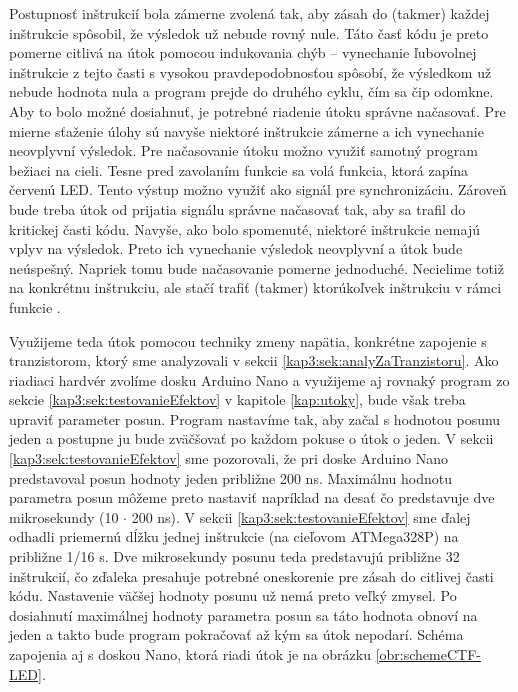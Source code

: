 Postupnosť inštrukcií bola zámerne zvolená tak, aby zásah do (takmer) každej inštrukcie spôsobil, že výsledok už nebude rovný nule. Táto časť kódu je preto pomerne citlivá na útok pomocou indukovania chýb -- vynechanie ľubovolnej inštrukcie z tejto časti s vysokou pravdepodobnosťou spôsobí, že výsledkom už nebude hodnota nula a program prejde do druhého cyklu, čím sa čip odomkne. Aby to bolo možné dosiahnuť, je potrebné riadenie útoku správne načasovať. Pre mierne sťaženie úlohy sú navyše niektoré inštrukcie zámerne  a ich vynechanie neovplyvní výsledok. Pre načasovanie útoku možno využiť samotný program bežiaci na cieli. Tesne pred zavolaním funkcie  sa volá funkcia, ktorá zapína červenú LED. Tento výstup možno využiť ako signál pre synchronizáciu. Zároveň bude treba útok od prijatia signálu správne načasovať tak, aby sa trafil do kritickej časti kódu. Navyše, ako bolo spomenuté, niektoré inštrukcie nemajú vplyv na výsledok. Preto ich vynechanie výsledok neovplyvní a útok bude neúspešný. Napriek tomu bude načasovanie pomerne jednoduché. Necielime totiž na konkrétnu inštrukciu, ale stačí trafiť (takmer) ktorúkoľvek inštrukciu v rámci funkcie .

Využijeme teda útok pomocou techniky zmeny napätia, konkrétne zapojenie s tranzistorom, ktorý sme analyzovali v sekcii \ref{kap3:sek:analyZaTranzistoru}. Ako riadiaci hardvér zvolíme dosku Arduino Nano a využijeme aj rovnaký program zo sekcie \ref{kap3:sek:testovanieEfektov} v kapitole \ref{kap:utoky}, bude však treba upraviť parameter posun. Program nastavíme tak, aby začal s hodnotou posunu jeden a postupne ju bude zväčšovať po každom pokuse o útok o jeden. V sekcii \ref{kap3:sek:testovanieEfektov} sme pozorovali, že pri doske Arduino Nano predstavoval posun hodnoty jeden približne 200 ns. Maximálnu hodnotu parametra posun môžeme preto nastaviť napríklad na desať čo predstavuje dve mikrosekundy (10 $\cdot$ 200 ns). V sekcii \ref{kap3:sek:testovanieEfektov} sme ďalej odhadli priemernú dĺžku jednej inštrukcie (na cieľovom ATMega328P) na približne 1/16 \textmu s. Dve mikrosekundy posunu teda predstavujú približne 32 inštrukcií, čo zďaleka presahuje potrebné oneskorenie pre zásah do citlivej časti kódu. Nastavenie väčšej hodnoty posunu už nemá preto veľký zmysel. Po dosiahnutí maximálnej hodnoty parametra posun sa táto hodnota obnoví na jeden a takto bude program pokračovať až kým sa útok nepodarí. Schéma zapojenia aj s doskou Nano, ktorá riadi útok je na obrázku \ref{obr:schemeCTF-LED}.

